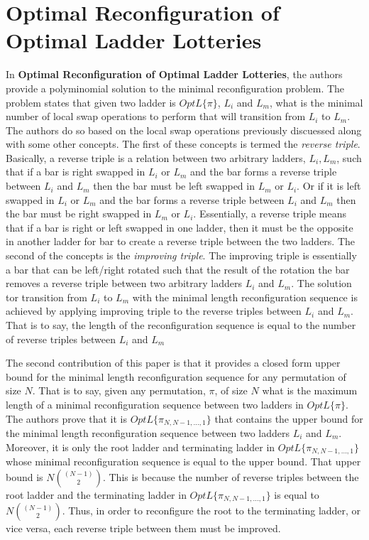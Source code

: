 \section{Optimal Reconfiguration of Optimal Ladder Lotteries}
In \textbf{Optimal Reconfiguration of Optimal Ladder Lotteries},
the authors provide a polyminomial solution to the 
minimal reconfiguration problem. The problem states that given 
two ladder is $OptL\{\pi\}$, $L_{i}$ and  $L_{m}$, what is the minimal number of 
local swap operations to perform that will transition from $L_{i}$ to $L_{m}$.
The authors do so based on the local swap operations previously 
discuessed along with some other concepts. The first of these concepts 
is termed the \emph{reverse triple}. Basically, a reverse triple is a relation
between two arbitrary ladders, $L_{i}, L_{m}$, such that if a bar is right swapped 
in $L_{i}$ or $L_{m}$ and the bar forms a reverse triple between $L_{i}$ and $L_{m}$ 
then the bar must be left swapped in $L_{m}$ or $L_{i}$. Or if it 
is left swapped in $L_{i}$ or $L_{m}$ and the bar forms a reverse triple 
between $L_{i}$ and $L_{m}$ then the bar must be right swapped in $L_{m}$ or $L_{i}$.
Essentially, a reverse triple means that if a bar is right or left swapped in one 
ladder, then it must be the opposite in another ladder for bar to create a 
reverse triple between the two ladders.   
The second of the concepts is the \emph{improving triple}. The improving triple is 
essentially a bar that can be left/right rotated such that the 
result of the rotation the bar removes a reverse triple between two arbitrary
ladders $L_{i}$ and $L_{m}$. The solution tor transition from 
$L_{i}$ to $L_{m}$ with the minimal length reconfiguration sequence 
is achieved by applying improving triple to the reverse triples between 
$L_{i}$ and $L_{m}$. That is to say, the length of the reconfiguration sequence 
is equal to the number of reverse triples between $L_{i}$ and  $L_{m}$\par
The second contribution of this paper is that it provides a closed form 
upper bound for the minimal length reconfiguration sequence for any permutation 
of size $N$. That is to say, given any permutation, $\pi$, of size $N$ what is the maximum 
length of a minimal reconfiguration sequence between two ladders in $OptL\{\pi\}$.
The authors prove that it is $OptL\{\pi_{N, N-1, \dots, 1}\}$ that contains the 
upper bound for the minimal length reconfiguration sequence between two ladders $L_{i}$ and 
$L_{m}$. Moreover, it is only the root ladder and terminating ladder in 
$OptL\{\pi_{N, N-1, \dots, 1}\}$ whose minimal reconfiguration sequence is equal to 
the upper bound. That upper bound is $N{(N-1) \choose 2}$. This is because 
the number of reverse triples between the root ladder and the terminating ladder 
in $OptL\{\pi_{N, N-1, \dots, 1}\}$ is equal to $N{(N-1) \choose 2}$. Thus, in 
order to reconfigure the root to the terminating ladder, or vice versa, each 
reverse triple between them must be improved.

